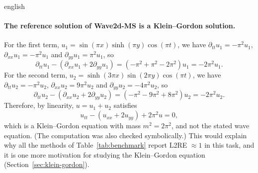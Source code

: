 \documentclass[0000.tex]{subfiles}
\begin{document}
\begin{hyphenrules}{english}
\paragraph{The reference solution of Wave2d-MS is a Klein--Gordon solution.}
For the first term, $u_1=\sin(\pi x)\sinh(\pi y)\cos(\pi t)$, we have $\partial_{tt}u_1=-\pi^2u_1$,
$\partial_{xx}u_1=-\pi^2u_1$ and $\partial_{yy}u_1=\pi^2u_1$, so
\[
  \partial_{tt}u_1-(\partial_{xx}u_1+2\partial_{yy}u_1)=(-\pi^2+\pi^2-2\pi^2)u_1=-2\pi^2u_1.
\]
For the second term, $u_2=\sinh(3\pi x)\sin(2\pi y)\cos(\pi t)$, we have $\partial_{tt}u_2=-\pi^2u_2$,
$\partial_{xx}u_2=9\pi^2u_2$ and $\partial_{yy}u_2=-4\pi^2u_2$, so
\[
  \partial_{tt}u_2-(\partial_{xx}u_2+2\partial_{yy}u_2)=(-\pi^2-9\pi^2+8\pi^2)u_2=-2\pi^2u_2.
\]
Therefore, by linearity, $u=u_1+u_2$ satisfies
\begin{equation}
  u_{tt}-(u_{xx}+2u_{yy})+2\pi^2u=0,
  \label{eq:wave2dms-kg}
\end{equation}
which is a Klein--Gordon equation with mass $m^2=2\pi^2$, and not the stated wave equation. (The
computation was also checked symbolically.) This would explain why all the methods of
Table~\ref{tab:benchmark} report L2RE $\approx1$ in this task, and it is one more motivation for studying the
Klein--Gordon equation (Section~\ref{sec:klein-gordon}).

\end{hyphenrules}

\ifSubfilesClassLoaded{}{}
\end{document}
